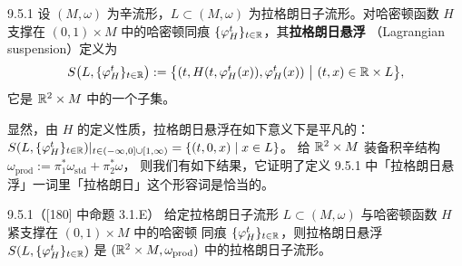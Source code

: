 \begin{wdefn}{9.5.1}
设 $(M,\omega)$ 为辛流形，$L\subset(M,\omega)$ 为拉格朗日子流形。对哈密顿函数 $H$ 支撑在
$(0,1)\times M$ 中的哈密顿同痕 $\{\varphi_H^t\}_{t\in\mathbb{R}}$，其\textbf{拉格朗日悬浮}
（Lagrangian suspension）定义为
\[
  S\big(L,\{\varphi_H^t\}_{t\in\R}\big)
  :=\big\{(t,H(t,\varphi_H^t(x)),\varphi_H^t(x))\ \big|\ (t,x)\in\R\times L\big\},
\]
它是 $\mathbb{R}^2\times M$ 中的一个子集。
\end{wdefn}

显然，由 $H$ 的定义性质，拉格朗日悬浮在如下意义下是平凡的：
$S(L,\{\varphi_H^t\}_{t\in\mathbb{R}})|_{t\in(-\infty,0]\cup[1,\infty)}=\{(t,0,x)\mid x\in L\}$。
给 $\mathbb{R}^2\times M$ 装备积辛结构 $\omega_{\mathrm{prod}}:=\pi_1^*\omega_{\mathrm{std}}+\pi_2^*\omega$，
则我们有如下结果，它证明了定义 9.5.1 中「拉格朗日悬浮」一词里「拉格朗日」这个形容词是恰当的。

\begin{wlem}{9.5.1}（[180] 中命题 3.1.E）
给定拉格朗日子流形 $L\subset(M,\omega)$ 与哈密顿函数 $H$ 紧支撑在 $(0,1)\times M$ 中的哈密顿
同痕 $\{\varphi_H^t\}_{t\in\mathbb{R}}$，则拉格朗日悬浮 $S(L,\{\varphi_H^t\}_{t\in\mathbb{R}})$ 是
$(\mathbb{R}^2\times M,\omega_{\mathrm{prod}})$ 中的拉格朗日子流形。
\end{wlem}

